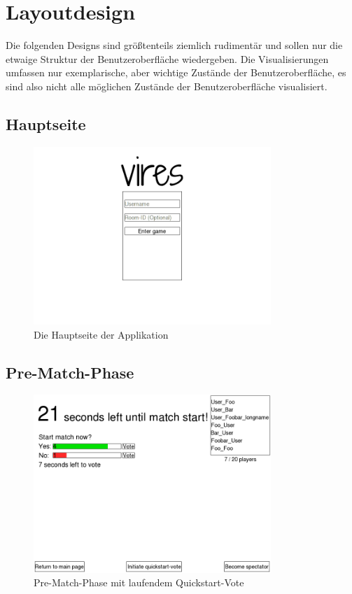 \section{Layoutdesign}
Die folgenden Designs sind größtenteils ziemlich rudimentär und sollen nur die etwaige Struktur der Benutzeroberfläche wiedergeben. Die Visualisierungen umfassen nur exemplarische, aber wichtige Zustände der Benutzeroberfläche, es sind also nicht alle möglichen Zustände der Benutzeroberfläche visualisiert.

\subsection{Hauptseite}
\begin{figure}[H]
    \centering
    \includegraphics[width=0.8\textwidth]{mainpage.png}
    \caption{Die Hauptseite der Applikation}
\end{figure}

\subsection{Pre-Match-Phase}
\begin{figure}[H]
    \centering
    \includegraphics[width=0.8\textwidth]{pre-match-phase.png}
    \caption{Pre-Match-Phase mit laufendem Quickstart-Vote}
\end{figure}

